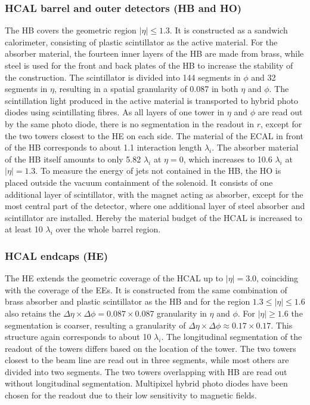 \subsubsection*{HCAL barrel and outer detectors (HB and HO)}  
The HB covers the geometric region $\vert \eta \vert \leq 1.3$. It is constructed as a sandwich calorimeter, consisting of plastic scintillator as the active material. For the absorber material, the fourteen inner layers of the HB are made from brass, while steel is used for the front and back plates of the HB to increase the stability of the construction. The scintillator is divided into 144 segments in $\phi$ and 32 segments in $\eta$, resulting in a spatial granularity of 0.087 in both $\eta$ and $\phi$. The scintillation light produced in the active material is transported to hybrid photo diodes using scintillating fibres. As all layers of one tower in $\eta$ and $\phi$ are read out by the same photo diode, there is no segmentation in the readout in $r$, except for the two towers closest to the HE on each side. The material of the ECAL in front of the HB corresponds to about 1.1 interaction length $\lambda_i$. The absorber material of the HB itself amounts to only 5.82 $\lambda_i$ at $\eta = 0$, which increases to 10.6 $\lambda_i$ at $\vert \eta \vert = 1.3$. To measure the energy of jets not contained in the HB, the HO is placed outside the vacuum containment of the solenoid. It consists of one additional layer of scintillator, with the magnet acting as absorber, except for the most central part of the detector, where one additional layer of steel absorber and scintillator are installed. Hereby the material budget of the HCAL is increased to at least 10 $\lambda_i$ over the whole barrel region.

\subsubsection*{HCAL endcaps (HE)}
The HE extends the geometric coverage of the HCAL up to $\vert\eta\vert =3.0$, coinciding with the coverage of the EEs. It is constructed from the same combination of brass absorber and plastic scintillator as the HB and for the region $1.3 \leq \vert\eta\vert \leq 1.6$ also retains the $\Delta\eta \times \Delta \phi = 0.087\times 0.087$ granularity in $\eta$ and $\phi$. For $\vert\eta\vert \geq 1.6$ the segmentation is coarser, resulting a granularity of $\Delta\eta \times \Delta \phi \approx 0.17\times0.17$. This structure again corresponds to about 10 $\lambda_i$. The longitudinal segmentation of the readout of the towers differs based on the location of the tower. The two towers closest to the beam line are read out in three segments, while most others are divided into two segments. The two towers overlapping with HB are read out without longitudinal segmentation. Multipixel hybrid photo diodes have been chosen for the readout due to their low sensitivity to magnetic fields.

